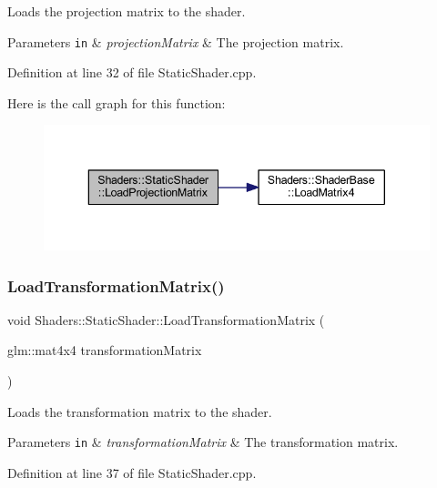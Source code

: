 Loads the projection matrix to the shader. 
\begin{DoxyParams}[1]{Parameters}
\mbox{\tt in}  & {\em projection\+Matrix} & The projection matrix. \\
\hline
\end{DoxyParams}


Definition at line 32 of file Static\+Shader.\+cpp.

Here is the call graph for this function\+:
\nopagebreak
\begin{figure}[H]
\begin{center}
\leavevmode
\includegraphics[width=343pt]{class_shaders_1_1_static_shader_a7133b5436145e2769cb940835e59a5f7_cgraph}
\end{center}
\end{figure}
\mbox{\label{class_shaders_1_1_static_shader_ab0241a6caf6b7a9fe48b35da63a1cefb}} 
\subsubsection{\texorpdfstring{Load\+Transformation\+Matrix()}{LoadTransformationMatrix()}}
{\footnotesize\ttfamily void Shaders\+::\+Static\+Shader\+::\+Load\+Transformation\+Matrix (\begin{DoxyParamCaption}\item[{glm\+::mat4x4}]{transformation\+Matrix }\end{DoxyParamCaption})}

Loads the transformation matrix to the shader. 
\begin{DoxyParams}[1]{Parameters}
\mbox{\tt in}  & {\em transformation\+Matrix} & The transformation matrix. \\
\hline
\end{DoxyParams}


Definition at line 37 of file Static\+Shader.\+cpp.

